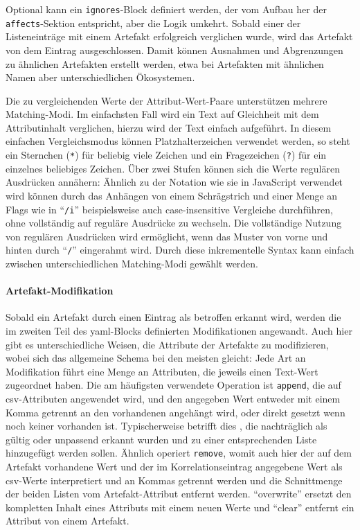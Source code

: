Optional kann ein \texttt{ignores}-Block definiert werden, der vom Aufbau her der \texttt{affects}-Sektion entspricht, aber die Logik umkehrt.
Sobald einer der Listeneinträge mit einem Artefakt erfolgreich verglichen wurde, wird das Artefakt von dem Eintrag ausgeschlossen.
Damit können Ausnahmen und Abgrenzungen zu ähnlichen Artefakten erstellt werden, etwa bei Artefakten mit ähnlichen Namen aber unterschiedlichen Ökosystemen.

Die zu vergleichenden Werte der Attribut-Wert-Paare unterstützen mehrere Matching-Modi.
Im einfachsten Fall wird ein Text auf Gleichheit mit dem Attributinhalt verglichen, hierzu wird der Text einfach aufgeführt.
In diesem einfachen Vergleichsmodus können Platzhalterzeichen verwendet werden, so steht ein Sternchen (\texttt{*}) für beliebig viele Zeichen und ein Fragezeichen (\texttt{?}) für ein einzelnes beliebiges Zeichen.
Über zwei Stufen können sich die Werte regulären Ausdrücken annähern:
Ähnlich zu der Notation wie sie in JavaScript verwendet wird \autocite{MdnRegularExpressions2025} können durch das Anhängen von einem Schrägstrich und einer Menge an Flags wie in \enquote{\texttt{/i}} beispielsweise auch case-insensitive Vergleiche durchführen, ohne vollständig auf reguläre Ausdrücke zu wechseln.
Die vollständige Nutzung von regulären Ausdrücken wird ermöglicht, wenn das Muster von vorne und hinten durch \enquote{\texttt{/}} eingerahmt wird.
Durch diese inkrementelle Syntax kann einfach zwischen unterschiedlichen Matching-Modi gewählt werden.

\paragraph{Artefakt-Modifikation}
Sobald ein Artefakt durch einen Eintrag als betroffen erkannt wird, werden die im zweiten Teil des \acrshort{yaml}-Blocks definierten Modifikationen angewandt.
Auch hier gibt es unterschiedliche Weisen, die Attribute der Artefakte zu modifizieren, wobei sich das allgemeine Schema bei den meisten gleicht:
Jede Art an Modifikation führt eine Menge an Attributen, die jeweils einen Text-Wert zugeordnet haben.
Die am häufigsten verwendete Operation ist \texttt{append}, die auf \acrfull{csv}-Attributen angewendet wird, und den angegeben Wert entweder mit einem Komma getrennt an den vorhandenen angehängt wird, oder direkt gesetzt wenn noch keiner vorhanden ist.
Typischerweise betrifft dies , die nachträglich als gültig oder unpassend erkannt wurden und zu einer entsprechenden Liste hinzugefügt werden sollen.
Ähnlich operiert \texttt{remove}, womit auch hier der auf dem Artefakt vorhandene Wert und der im Korrelationseintrag angegebene Wert als \acrshort{csv}-Werte interpretiert und an Kommas getrennt werden und die Schnittmenge der beiden Listen vom Artefakt-Attribut entfernt werden.
\enquote{overwrite} ersetzt den kompletten Inhalt eines Attributs mit einem neuen Werte und \enquote{clear} entfernt ein Attribut von einem Artefakt.

